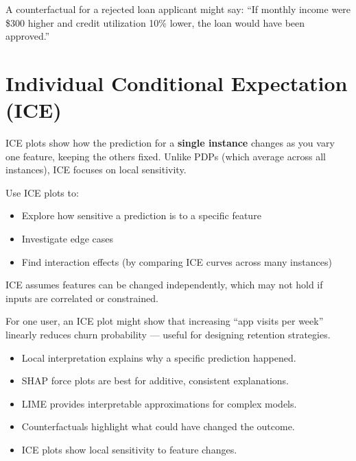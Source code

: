 \documentclass[12pt,openany]{book}
\begin{document}
\begin{examplebox}
A counterfactual for a rejected loan applicant might say: ``If monthly income were \$300 higher and credit utilization 10\% lower, the loan would have been approved.''
\end{examplebox}



\section{Individual Conditional Expectation (ICE)}

ICE plots show how the prediction for a \textbf{single instance} changes as you vary one feature, keeping the others fixed. Unlike PDPs (which average across all instances), ICE focuses on local sensitivity.

Use ICE plots to:
\begin{itemize}
  \item Explore how sensitive a prediction is to a specific feature
  \item Investigate edge cases
  \item Find interaction effects (by comparing ICE curves across many instances)
\end{itemize}

\noindent\begin{minipage}{\textwidth}
\begin{notebox}
ICE assumes features can be changed independently, which may not hold if inputs are correlated or constrained.
\end{notebox}
\end{minipage}

\begin{examplebox}
For one user, an ICE plot might show that increasing ``app visits per week'' linearly reduces churn probability — useful for designing retention strategies.
\end{examplebox}

\begin{summarybox}
\begin{itemize}
  \item Local interpretation explains why a specific prediction happened.
  \item SHAP force plots are best for additive, consistent explanations.
  \item LIME provides interpretable approximations for complex models.
  \item Counterfactuals highlight what could have changed the outcome.
  \item ICE plots show local sensitivity to feature changes.
\end{itemize}
\end{summarybox}
\end{document}
